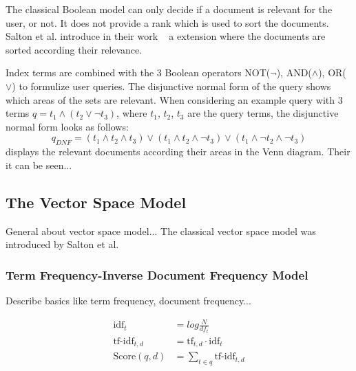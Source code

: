 The classical Boolean model can only decide if a document is relevant for the user, or not. It does not provide a rank which is used to sort the documents. Salton et al. introduce in their work ~\cite{Salton-Extended-1983} a extension where the documents are sorted according their relevance.

Index terms are combined with the $3$ Boolean operators NOT($\neg$), AND($\wedge$), OR($\vee$) to formulize user queries. The disjunctive normal form of the query shows which areas of the sets are relevant. When considering an example query with $3$ terms $q=t_1 \wedge (t_2 \vee \neg t_3)$, where $t_1$, $t_2$, $t_3$ are the query terms, the disjunctive normal form looks as follows:
\begin{equation}
q_{DNF} = (t_1 \wedge t_2 \wedge t_3) \vee (t_1 \wedge t_2 \wedge \neg t_3) \vee (t_1 \wedge \neg t_2 \wedge \neg t_3)
\end{equation}
 displays the relevant documents according their areas in the Venn diagram. Their it can be seen... %

\subsection{The Vector Space Model}
\label{sec:the_vector_space_model}

General about vector space model... The classical vector space model was introduced by Salton et al.~\cite{salton75vsm}

\subsubsection{Term Frequency-Inverse Document Frequency Model}
\label{sec:tfidf}


Describe basics like term frequency, document frequency...

\begin{equation}
  \begin{split}
    \text{idf}_t & = log \frac{N}{df_t} \\
    \text{tf-idf}_{t, d} & = \text{tf}_{t, d} \cdot \text{idf}_t \\
    \text{Score}(q, d) & = \sum_{t \in q}\text{tf-idf}_{t, d}
  \end{split}
\end{equation}

